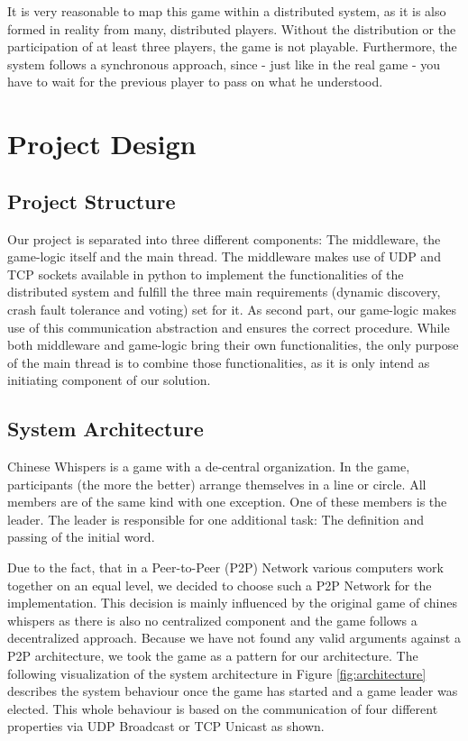 \documentclass[runningheads]{llncs}
\begin{document}
    It is very reasonable to map this game within a distributed system, as it is also formed in reality from many, distributed players. Without the distribution or the participation of at least three players, the game is not playable. Furthermore, the system follows a synchronous approach, since - just like in the real game - you have to wait for the previous player to pass on what he understood.
    
\section{Project Design}
    \subsection{Project Structure}
        Our project is separated into three different components: The middleware, the game-logic itself and the main thread. The middleware makes use of UDP and TCP sockets available in python to implement the functionalities of the distributed system and fulfill the three main requirements (dynamic discovery, crash fault tolerance and voting) set for it. As second part, our game-logic makes use of this communication abstraction and ensures the correct procedure. While both middleware and game-logic bring their own functionalities, the only purpose of the main thread is to combine those functionalities, as it is only intend as initiating component of our solution.
    
    \subsection{System Architecture}
        Chinese Whispers is a game with a de-central organization. In the game, participants (the more the better) arrange themselves in a line or circle. All members are of the same kind with one exception. One of these members is the leader. The leader is responsible for one additional task: The definition and passing of the initial word. 
        
        Due to the fact, that in a Peer-to-Peer (P2P) Network various computers work together on an equal level, we decided to choose such a P2P Network for the implementation. This decision is mainly influenced by the original game of chines whispers as there is also no centralized component and the game follows a decentralized approach. Because we have not found any valid arguments against a P2P architecture, we took the game as a pattern for our architecture. The following visualization of the system architecture in Figure \ref{fig:architecture} describes the system behaviour once the game has started and a game leader was elected. This whole behaviour is based on the communication of four different properties via UDP Broadcast or TCP Unicast as shown.
        
\end{document}
